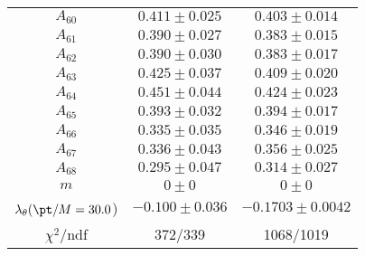 \begin{tabular}{c|c|c}
$A_60$ & $0.411\pm0.025$ & $0.403\pm0.014$ \\
$A_61$ & $0.390\pm0.027$ & $0.383\pm0.015$ \\
$A_62$ & $0.390\pm0.030$ & $0.383\pm0.017$ \\
$A_63$ & $0.425\pm0.037$ & $0.409\pm0.020$ \\
$A_64$ & $0.451\pm0.044$ & $0.424\pm0.023$ \\
$A_65$ & $0.393\pm0.032$ & $0.394\pm0.017$ \\
$A_66$ & $0.335\pm0.035$ & $0.346\pm0.019$ \\
$A_67$ & $0.336\pm0.043$ & $0.356\pm0.025$ \\
$A_68$ & $0.295\pm0.047$ & $0.314\pm0.027$ \\
$m$ & $0\pm0$ & $0\pm0$ \\
$\lambda_\theta(\pt/M = 30.0$) & $-0.100\pm0.036$ & $-0.1703\pm0.0042$ \\
\hline
$\chi^2$/ndf & 372/339 & 1068/1019
\end{tabular}
